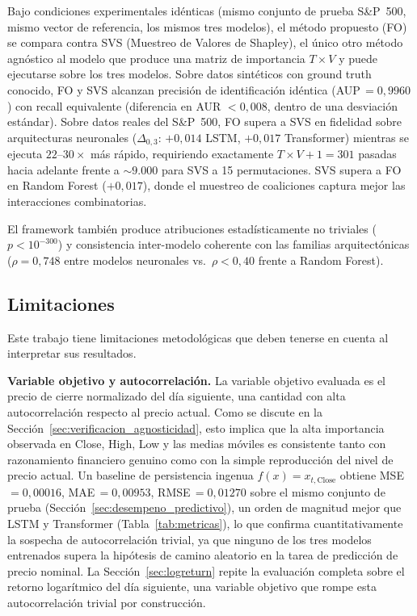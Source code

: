 \documentclass[conference, letterpaper]{IEEEtran}
\begin{document}
Bajo condiciones experimentales idénticas (mismo conjunto de prueba
S\&P~500, mismo vector de referencia, los mismos tres modelos), el
método propuesto (FO) se compara contra SVS (Muestreo de Valores de
Shapley), el único otro método agnóstico al modelo que produce una
matriz de importancia $T{\times}V$ y puede ejecutarse sobre los tres
modelos. Sobre datos sintéticos con ground truth conocido, FO y SVS
alcanzan precisión de identificación idéntica (AUP\,$=0{,}9960$) con
recall equivalente (diferencia en AUR $< 0{,}008$, dentro de una
desviación estándar). Sobre datos reales del S\&P~500, FO supera a
SVS en fidelidad sobre arquitecturas neuronales ($\Delta_{0{,}3}$:
$+0{,}014$ LSTM, $+0{,}017$ Transformer) mientras se ejecuta
$22$--$30{\times}$ más rápido, requiriendo exactamente
$T{\times}V{+}1{=}301$ pasadas hacia adelante frente a ${\sim}9{.}000$
para SVS a 15 permutaciones. SVS supera a FO en Random Forest
($+0{,}017$), donde el muestreo de coaliciones captura mejor las
interacciones combinatorias.

El framework también produce atribuciones estadísticamente no
triviales ($p < 10^{-300}$) y consistencia inter-modelo coherente
con las familias arquitectónicas ($\rho = 0{,}748$ entre modelos
neuronales vs.\ $\rho < 0{,}40$ frente a Random Forest).

\subsection{Limitaciones}
\label{sec:limitaciones}

Este trabajo tiene limitaciones metodológicas que deben tenerse en
cuenta al interpretar sus resultados.

\textbf{Variable objetivo y autocorrelación.} La variable objetivo
evaluada es el precio de cierre normalizado del día siguiente, una
cantidad con alta autocorrelación respecto al precio actual. Como
se discute en la Sección~\ref{sec:verificacion_agnosticidad}, esto
implica que la alta importancia observada en Close, High, Low y las
medias móviles es consistente tanto con razonamiento financiero
genuino como con la simple reproducción del nivel de precio actual.
Un baseline de persistencia ingenua $f(x) = x_{t,\text{Close}}$
obtiene MSE\,$=0{,}00016$, MAE\,$=0{,}00953$, RMSE\,$=0{,}01270$
sobre el mismo conjunto de prueba (Sección~\ref{sec:desempeno_predictivo}),
un orden de magnitud mejor que LSTM y Transformer (Tabla~\ref{tab:metricas}),
lo que confirma cuantitativamente la sospecha de autocorrelación
trivial, ya que ninguno de los tres modelos entrenados supera la hipótesis
de camino aleatorio en la tarea de predicción de precio nominal.
La Sección~\ref{sec:logreturn} repite la evaluación completa sobre
el retorno logarítmico del día siguiente, una variable objetivo que
rompe esta autocorrelación trivial por construcción.
\end{document}
